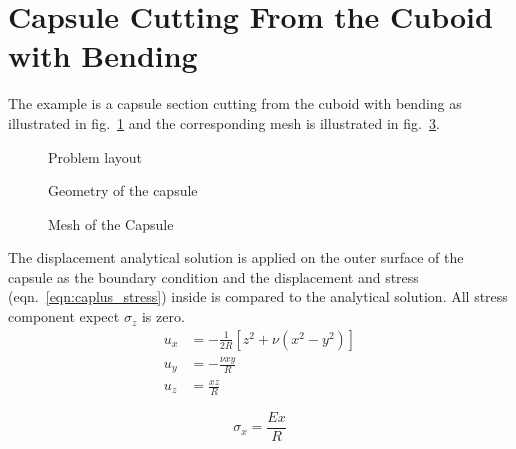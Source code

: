 \section{Capsule Cutting From the Cuboid with Bending}
The example is a capsule section cutting from the cuboid with bending as illustrated in fig.~\ref{oct_fig:ex_caplus_layout} and the corresponding mesh is illustrated in fig.~\ref{oct_fig:ex_caplus_mesh1.png}.
\begin{figure}[h!]
  \centering
  \caption{Problem layout}
  \label{oct_fig:ex_caplus_layout}
\end{figure}

\begin{figure}[h!]
  \centering
  \caption{Geometry of the capsule}
  \label{oct_fig:ex_caplus_geo}
\end{figure}


\begin{figure}[h!]
    \centering
    \begin{subfigure}[b]{1\linewidth}
    \end{subfigure}
    \begin{subfigure}[b]{1\linewidth}
    \end{subfigure}
    \caption{Mesh of the Capsule}
    \label{oct_fig:ex_caplus_mesh1.png}
\end{figure}

The displacement analytical solution \cite{Tim1951} is applied on the outer surface of the capsule as the boundary condition and the displacement and stress (eqn.~\ref{eqn:caplus_stress}) inside is compared to the analytical solution. All stress component expect $\sigma_z$ is zero.
\begin{subequations}
\begin{align}
  u_x &= -\frac{1}{2R}\left[z^2 + \nu \left(x^2 - y^2 \right)\right]\\
  u_y &= -\frac{\nu xy}{R}\\
  u_z &= \frac{xz}{R} 
  \label{eqn:capluse_displacement}
\end{align}
\end{subequations}

\begin{equation}
  \sigma_x = \frac{Ex}{R}
  \label{eqn:caplus_stress}
\end{equation}

